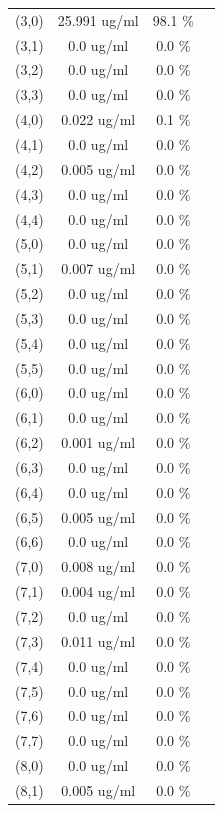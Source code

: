 \documentclass{article}
\begin{document}
\begin{tabular}{c c c c}
(3,0)&        25.991 ug/ml        &98.1 \%\\
(3,1)&        0.0 ug/ml        &0.0 \%\\
(3,2)&        0.0 ug/ml        &0.0 \%\\
(3,3)&        0.0 ug/ml        &0.0 \%\\
(4,0)&        0.022 ug/ml        &0.1 \%\\
(4,1)&        0.0 ug/ml        &0.0 \%\\
(4,2)&        0.005 ug/ml        &0.0 \%\\
(4,3)&        0.0 ug/ml        &0.0 \%\\
(4,4)&        0.0 ug/ml        &0.0 \%\\
(5,0)&        0.0 ug/ml        &0.0 \%\\
(5,1)&        0.007 ug/ml        &0.0 \%\\
(5,2)&        0.0 ug/ml        &0.0 \%\\
(5,3)&        0.0 ug/ml        &0.0 \%\\
(5,4)&        0.0 ug/ml        &0.0 \%\\
(5,5)&        0.0 ug/ml        &0.0 \%\\
(6,0)&        0.0 ug/ml        &0.0 \%\\
(6,1)&        0.0 ug/ml        &0.0 \%\\
(6,2)&        0.001 ug/ml        &0.0 \%\\
(6,3)&        0.0 ug/ml        &0.0 \%\\
(6,4)&        0.0 ug/ml        &0.0 \%\\
(6,5)&        0.005 ug/ml        &0.0 \%\\
(6,6)&        0.0 ug/ml        &0.0 \%\\
(7,0)&        0.008 ug/ml        &0.0 \%\\
(7,1)&        0.004 ug/ml        &0.0 \%\\
(7,2)&        0.0 ug/ml        &0.0 \%\\
(7,3)&        0.011 ug/ml        &0.0 \%\\
(7,4)&        0.0 ug/ml        &0.0 \%\\
(7,5)&        0.0 ug/ml        &0.0 \%\\
(7,6)&        0.0 ug/ml        &0.0 \%\\
(7,7)&        0.0 ug/ml        &0.0 \%\\
(8,0)&        0.0 ug/ml        &0.0 \%\\
(8,1)&        0.005 ug/ml        &0.0 \%\\

\end{tabular}
\end{document}
